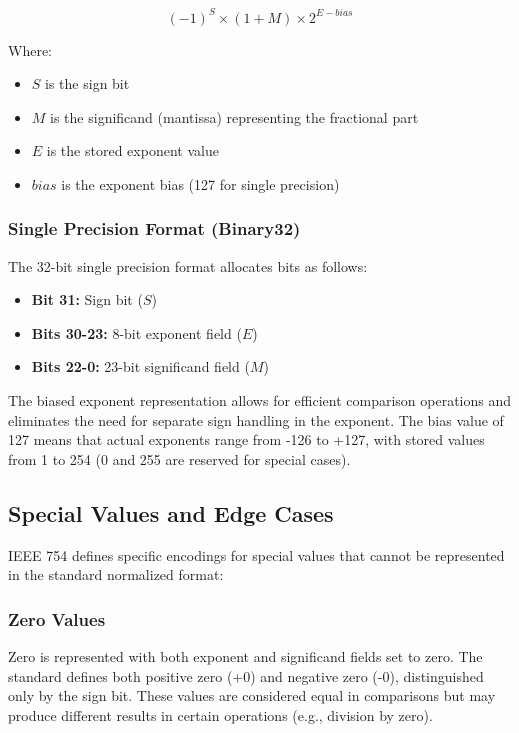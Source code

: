 $$(-1)^S \times (1 + M) \times 2^{E-bias}$$

Where:
\begin{itemize}
\item $S$ is the sign bit
\item $M$ is the significand (mantissa) representing the fractional part
\item $E$ is the stored exponent value
\item $bias$ is the exponent bias (127 for single precision)
\end{itemize}

\subsubsection{Single Precision Format (Binary32)}
\label{subsubsec:single_precision}

The 32-bit single precision format allocates bits as follows:

\begin{itemize}
\item \textbf{Bit 31:} Sign bit ($S$)
\item \textbf{Bits 30-23:} 8-bit exponent field ($E$)
\item \textbf{Bits 22-0:} 23-bit significand field ($M$)
\end{itemize}

The biased exponent representation allows for efficient comparison operations and eliminates the need for separate sign handling in the exponent. The bias value of 127 means that actual exponents range from -126 to +127, with stored values from 1 to 254 (0 and 255 are reserved for special cases).

\subsection{Special Values and Edge Cases}
\label{subsec:ieee754_special_values}

IEEE 754 defines specific encodings for special values that cannot be represented in the standard normalized format:

\subsubsection{Zero Values}
\label{subsubsec:zero_values}

Zero is represented with both exponent and significand fields set to zero. The standard defines both positive zero (+0) and negative zero (-0), distinguished only by the sign bit. These values are considered equal in comparisons but may produce different results in certain operations (e.g., division by zero).

